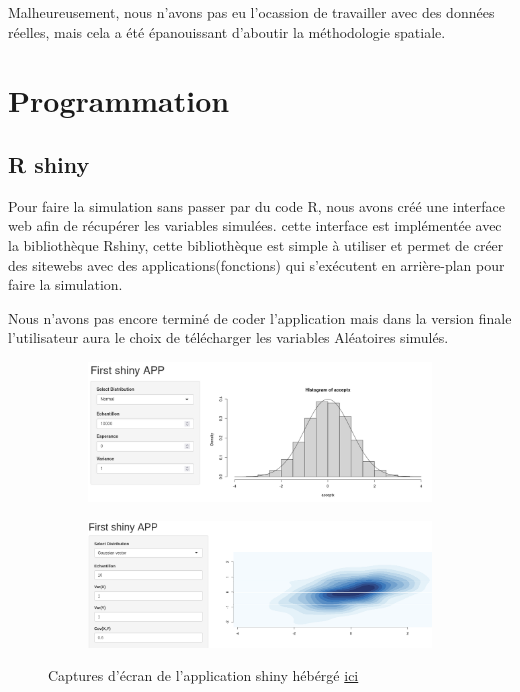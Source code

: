 \documentclass[10pt]{article} %
\begin{document}
Malheureusement, nous n'avons pas eu l'ocassion de travailler avec des données réelles, mais cela a été épanouissant d'aboutir la méthodologie spatiale.


\section{Programmation}
\subsection{R shiny}

Pour faire la simulation sans passer par du code R, nous avons créé une interface web afin de récupérer les variables simulées.
cette interface est implémentée avec la bibliothèque Rshiny, cette bibliothèque est simple à utiliser et permet de créer des sitewebs
avec des applications(fonctions) qui s'exécutent en arrière-plan pour faire la simulation.

Nous n'avons pas encore terminé de coder l'application mais dans la version finale l'utilisateur aura le choix de télécharger les variables
Aléatoires simulés.

\begin{figure}[h!]
    \centering
    \begin{subfigure}[b]{0.48\textwidth}
        \centering
        \includegraphics[width=\textwidth]{media/apppic1.png}
        \label{gauss plasma}
    \end{subfigure}
    \hfill
    \begin{subfigure}[b]{0.48\textwidth}
        \centering
        \includegraphics[width=\textwidth]{media/rshiny_gauss.png}
        \label{fig:three sin x}
    \end{subfigure}
    \caption{Captures d'écran de l'application shiny hébérgé \href{https://sousmarin.shinyapps.io/shinysousmarin/}{ici}}
\end{figure}
\end{document}
